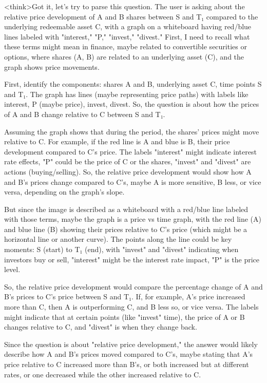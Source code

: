 <think>Got it, let's try to parse this question. The user is asking about the relative price development of A and B shares between S and T₁ compared to the underlying redeemable asset C, with a graph on a whiteboard having red/blue lines labeled with "interest," "P," "invest," "divest." First, I need to recall what these terms might mean in finance, maybe related to convertible securities or options, where shares (A, B) are related to an underlying asset (C), and the graph shows price movements.

First, identify the components: shares A and B, underlying asset C, time points S and T₁. The graph has lines (maybe representing price paths) with labels like interest, P (maybe price), invest, divest. So, the question is about how the prices of A and B change relative to C between S and T₁.

Assuming the graph shows that during the period, the shares' prices might move relative to C. For example, if the red line is A and blue is B, their price development compared to C's price. The labels "interest" might indicate interest rate effects, "P" could be the price of C or the shares, "invest" and "divest" are actions (buying/selling). So, the relative price development would show how A and B's prices change compared to C's, maybe A is more sensitive, B less, or vice versa, depending on the graph's slope.

But since the image is described as a whiteboard with a red/blue line labeled with those terms, maybe the graph is a price vs time graph, with the red line (A) and blue line (B) showing their prices relative to C's price (which might be a horizontal line or another curve). The points along the line could be key moments: S (start) to T₁ (end), with "invest" and "divest" indicating when investors buy or sell, "interest" might be the interest rate impact, "P" is the price level.

So, the relative price development would compare the percentage change of A and B's prices to C's price between S and T₁. If, for example, A's price increased more than C, then A is outperforming C, and B less so, or vice versa. The labels might indicate that at certain points (like "invest" time), the price of A or B changes relative to C, and "divest" is when they change back.

Since the question is about "relative price development," the answer would likely describe how A and B's prices moved compared to C's, maybe stating that A's price relative to C increased more than B's, or both increased but at different rates, or one decreased while the other increased relative to C.

